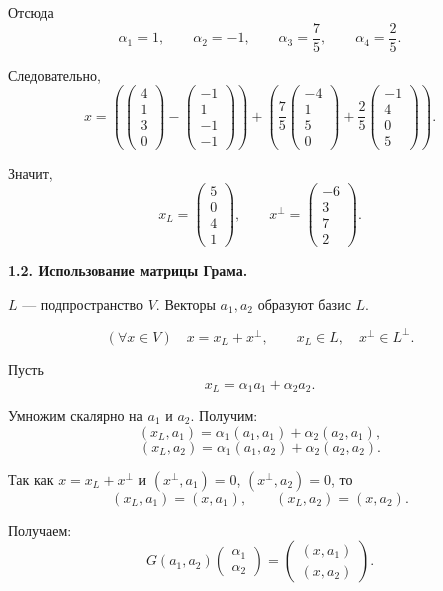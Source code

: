 Отсюда
\[
\alpha_1=1,\qquad
\alpha_2=-1,\qquad
\alpha_3=\frac75,\qquad
\alpha_4=\frac25.
\]

Следовательно,
\[
x=
\left(
\begin{pmatrix}
4\\
1\\
3\\
0
\end{pmatrix}
-
\begin{pmatrix}
-1\\
1\\
-1\\
-1
\end{pmatrix}
\right)
+
\left(
\frac75
\begin{pmatrix}
-4\\
1\\
5\\
0
\end{pmatrix}
+
\frac25
\begin{pmatrix}
-1\\
4\\
0\\
5
\end{pmatrix}
\right).
\]

Значит,
\[
x_L=
\begin{pmatrix}
5\\
0\\
4\\
1
\end{pmatrix},
\qquad
x^\perp=
\begin{pmatrix}
-6\\
3\\
7\\
2
\end{pmatrix}.
\]

\bigskip

\textbf{1.2. Использование матрицы Грама.}

$L$ --- подпространство $V$. Векторы $a_1,a_2$ образуют базис $L$.

\[
(\forall x\in V)\quad x=x_L+x^\perp,\qquad x_L\in L,\quad x^\perp\in L^\perp.
\]

Пусть
\[
x_L=\alpha_1a_1+\alpha_2a_2.
\]

Умножим скалярно на $a_1$ и $a_2$. Получим:
\[
(x_L,a_1)=\alpha_1(a_1,a_1)+\alpha_2(a_2,a_1),
\]
\[
(x_L,a_2)=\alpha_1(a_1,a_2)+\alpha_2(a_2,a_2).
\]

Так как $x=x_L+x^\perp$ и $(x^\perp,a_1)=0$, $(x^\perp,a_2)=0$, то
\[
(x_L,a_1)=(x,a_1),\qquad (x_L,a_2)=(x,a_2).
\]

Получаем:
\[
G(a_1,a_2)
\begin{pmatrix}
\alpha_1\\
\alpha_2
\end{pmatrix}
=
\begin{pmatrix}
(x,a_1)\\
(x,a_2)
\end{pmatrix}.
\]

